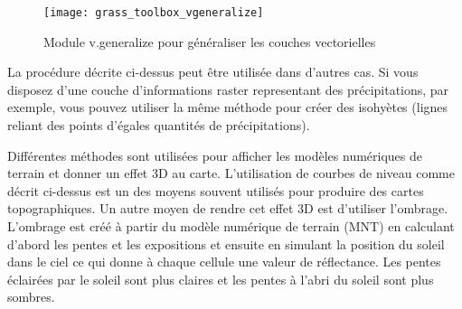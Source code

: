 {\begin{figure}[ht]
 \begin{center}
 \texttt{[image: grass\_toolbox\_vgeneralize]}
 \caption{Module \grass v.generalize pour généraliser les couches vectorielles \nixcaption}\label{fig:grass_toolbox_vgeneralize}
 \end{center}
\end{figure}

\begin{Tip}\caption{\textsc{Autres utilisations de r.contour}}
La procédure décrite ci-dessus peut être utilisée dans d'autres cas. Si vous disposez d'une couche d'informations raster representant des précipitations, par exemple, vous pouvez utiliser la même méthode pour créer des isohyètes (lignes reliant des points d'égales quantités de précipitations).
\end{Tip}


Différentes méthodes sont utilisées pour afficher les modèles numériques de terrain et donner un effet 3D au carte. L'utilisation de courbes de niveau comme décrit ci-dessus est un des moyens souvent utilisés pour produire des cartes topographiques. Un autre moyen de rendre cet effet 3D est d'utiliser l'ombrage. L'ombrage est créé à partir du modèle numérique de terrain (MNT) en calculant d'abord les pentes et les expositions et ensuite en simulant la position du soleil dans le ciel ce qui donne à chaque cellule une valeur de réflectance. Les pentes éclairées par le soleil sont plus claires et les pentes à l'abri du soleil sont plus sombres.

}
